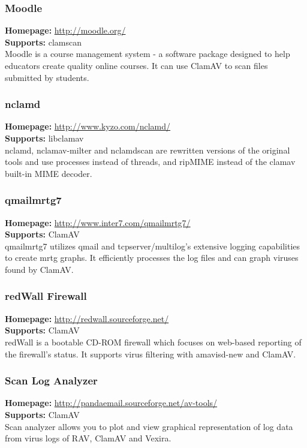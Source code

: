 \documentclass[a4paper,titlepage,12pt]{article}
\begin{document}
    \subsubsection{Moodle}
    \textbf{Homepage:} \url{http://moodle.org/}\\
    \textbf{Supports:} clamscan\\[4pt]
    Moodle is a course management system - a software package designed to help
    educators create quality online courses. It can use ClamAV to scan files
    submitted by students.

    \subsubsection{nclamd}
    \textbf{Homepage:} \url{http://www.kyzo.com/nclamd/}\\
    \textbf{Supports:} libclamav\\[4pt]
    nclamd, nclamav-milter and nclamdscan are rewritten versions of the
    original tools and use processes instead of threads, and ripMIME instead
    of the clamav built-in MIME decoder.

    \subsubsection{qmailmrtg7}
    \textbf{Homepage:} \url{http://www.inter7.com/qmailmrtg7/}\\
    \textbf{Supports:} ClamAV\\[4pt]
    qmailmrtg7 utilizes qmail and tcpserver/multilog's extensive logging
    capabilities to create mrtg graphs. It efficiently processes the log
    files and can graph viruses found by ClamAV.

    \subsubsection{redWall Firewall}
    \textbf{Homepage:} \url{http://redwall.sourceforge.net/}\\
    \textbf{Supports:} ClamAV\\[4pt]
    redWall is a bootable CD-ROM firewall which focuses on web-based
    reporting of the firewall's status. It supports virus filtering with
    amavisd-new and ClamAV.

    \subsubsection{Scan Log Analyzer}
    \textbf{Homepage:} \url{http://pandaemail.sourceforge.net/av-tools/}\\
    \textbf{Supports:} ClamAV\\[4pt]
    Scan analyzer allows you to plot and view graphical representation of
    log data from virus logs of RAV, ClamAV and Vexira. 
\end{document}
